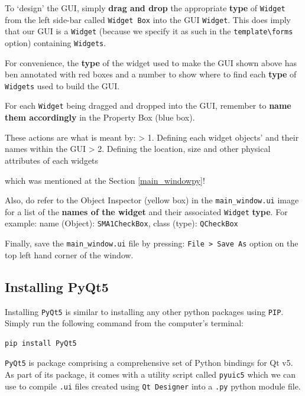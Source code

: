 \documentclass[11pt]{article}
\begin{document}
To `design' the GUI, simply \textbf{drag and drop} the appropriate
\textbf{type} of \texttt{Widget} from the left side-bar called
\texttt{Widget\ Box} into the GUI \texttt{Widget}. This does imply that
our GUI is a \texttt{Widget} (because we specify it as such in the
\texttt{template\textbackslash{}forms} option) containing
\texttt{Widgets}.

For convenience, the \textbf{type} of the widget used to make the GUI
shown above has ben annotated with red boxes and a number to show where
to find each \textbf{type} of \texttt{Widgets} used to build the GUI.

For each \texttt{Widget} being dragged and dropped into the GUI,
remember to \textbf{name them accordingly} in the Property Box (blue
box).

These actions are what is meant by: \textgreater{} 1. Defining each
widget objects' and their names within the GUI \textgreater{} 2.
Defining the location, size and other physical attributes of each
widgets

which was mentioned at the Section \ref{main_windowpy}!

Also, do refer to the Object Inspector (yellow box) in the
\texttt{main\_window.ui} image for a list of the \textbf{names of the
widget} and their associated \texttt{Widget} \textbf{type}. For example:
name (Object): \texttt{SMA1CheckBox}, class (type): \texttt{QCheckBox}

Finally, save the \texttt{main\_window.ui} file by pressing:
\texttt{File\ \textgreater{}\ Save\ As} option on the top left hand
corner of the window.

    \hypertarget{installing-pyqt5}{%
\subsection{Installing PyQt5}\label{installing-pyqt5}}

    Installing \texttt{PyQt5} is similar to installing any other python
packages using \texttt{PIP}. Simply run the following command from the
computer's terminal:

\begin{verbatim}
pip install PyQt5
\end{verbatim}

\texttt{PyQt5} is package comprising a comprehensive set of Python
bindings for Qt v5. As part of its package, it comes with a utility
script called \texttt{pyuic5} which we can use to compile \texttt{.ui}
files created using \texttt{Qt\ Designer} into a \texttt{.py} python
module file.
\end{document}
